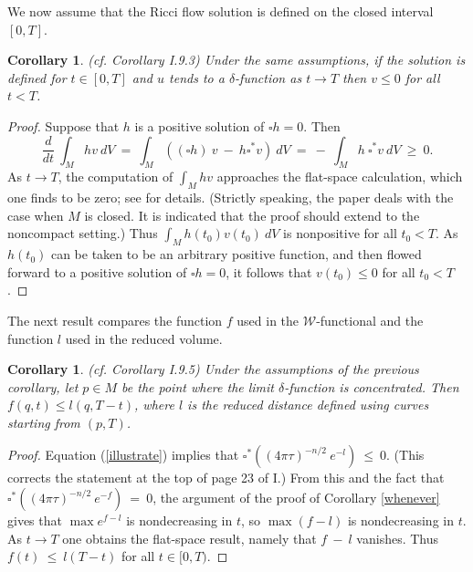 \documentclass[12pt]{amsart}
\numberwithin{equation}{section}
\theoremstyle{plain}
\newtheorem{corollary}[equation]{Corollary}
\theoremstyle{definition}
\theoremstyle{remark}
\begin{document}
We now assume that the Ricci flow solution is defined on 
the closed interval $[0, T]$.


\begin{corollary} (cf. Corollary I.9.3) \label{corI.9.3}
Under the same assumptions, if the solution is defined for
$t \in [0,T]$
and $u$ tends to a $\delta$-function as
$t \rightarrow T$ then $v \le 0$ for all $t < T$.
\end{corollary}
\begin{proof}
Suppose that $h$ is a positive solution of $\square h = 0$. Then
\begin{equation}
\frac{d}{dt} \: \int_M h v \: dV \: = \:
\int_M \left( (\square h) \: v \: - \:
h \square^* v \right) \:  dV \: = \:
- \: \int_M h \: \square^* v \: dV \: \ge \: 0.
\end{equation}
As $t \rightarrow T$, the computation of $\int_M hv$ approaches
the flat-space calculation, which one finds to be zero; see
\cite{Ni} for details. 
(Strictly speaking, the paper \cite{Ni} deals with the case when 
$M$ is closed. It is indicated that the proof should extend to the
noncompact setting.)
Thus
$\int_M h(t_0) v(t_0) \: dV$ is nonpositive for all $t_0<T$. As $h(t_0)$ can be
taken to be an arbitrary positive function, and then flowed forward to
a positive solution of $\square h = 0$, it follows that
$v(t_0) \le 0$ for all $t_0 < T$.
\end{proof}

The next result compares the function $f$ used in the ${\mathcal  W}$-functional
and the function $l$ used in the reduced volume.

\begin{corollary} (cf. Corollary I.9.5) \label{compare}
Under the assumptions of the previous corollary, let $p \in M$ be the
point where the limit $\delta$-function is concentrated. Then
$f(q,t) \le l(q, T-t)$, where $l$ is the reduced distance defined using
curves starting from $(p, T)$. 
\end{corollary}
\begin{proof}
Equation (\ref{illustrate}) implies that
$\square^* \left( (4 \pi \tau)^{-n/2} \: e^{-l} \right) \: \le \: 0$.
(This corrects the statement at the top of page 23 of I.) 
From this and the fact that 
$\square^* \left( (4 \pi \tau)^{-n/2} \: e^{-f} \right) \: = \: 0$,
the argument of the proof of Corollary \ref{whenever}  gives that
$\max e^{f-l}$ is nondecreasing in $t$, so
$\max (f-l)$ is nondecreasing in $t$. As $t \rightarrow T$ one
obtains the flat-space result, namely that $f \: - \: l$
vanishes.  Thus $f(t) \: \le \: l(T - t)$ for all $t \in [0, T)$.
\end{proof}
\end{document}
